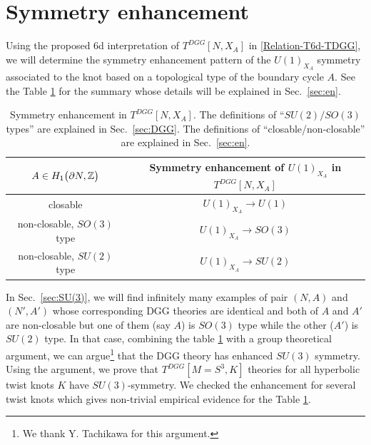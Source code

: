 \documentclass[a4paper,11pt]{article}
\begin{document}
\section{Symmetry enhancement  }\label{sec:symm}

Using the proposed 6d interpretation of $T^{DGG}[N,X_A]$ in \eqref{Relation-T6d-TDGG}, we will determine the  symmetry enhancement pattern of  the $U(1)_{X_A}$ symmetry associated to the knot based on a topological type of the boundary cycle $A$. 
See the Table \ref{Sym enhancement in DGG} for the summary whose details will be explained in Sec.~\ref{sec:en}.
%
\begin{table}[h!]
\centering
\begin{tabular}{|c || c | }
\hline
$A \in H_1 \big{(}\partial N,\mathbb{Z}\big{)}$ & Symmetry enhancement of $U(1)_{X_A}$  in $T^{ DGG}[N,X_A]$ 
\\
\hline
\hline
closable &  $U(1)_{X_A} \rightarrow U(1)$  \\\hline
non-closable, $SO(3)$ type   & $U(1)_{X_A} \rightarrow SO(3)$    \\
\hline
non-closable, $SU(2)$ type  & $U(1)_{X_A} \rightarrow SU(2)$   \\
\hline
\end{tabular}
\caption{Symmetry enhancement in $T^{DGG}[N,X_A]$. The definitions of ``$SU(2)/SO(3)$ types'' are explained in Sec.~\ref{sec:DGG}.
The definitions of ``closable/non-closable'' are explained in Sec.~\ref{sec:en}.}
\label{Sym enhancement in DGG}
\end{table}
%

In Sec.~\ref{sec:SU(3)}, 
we will find infinitely many examples of pair $(N,A)$ and $(N',A')$ whose corresponding DGG theories are identical and both of $A$ and $A'$ are non-closable but 
one of them (say $A$) is $SO(3)$ type while the other ($A'$) is $SU(2)$ type. In that case, combining the table \ref{Sym enhancement in DGG} with a group theoretical argument,  we can argue\footnote{We thank Y. Tachikawa for this argument.} that the DGG theory has enhanced $SU(3)$ symmetry. Using the argument, we prove that $T^{DGG}[M=S^3, K]$ theories for all hyperbolic twist knots $K$ have $SU(3)$-symmetry. We checked the enhancement for several twist knots which gives  non-trivial empirical evidence for the Table \ref{Sym enhancement in DGG}. 
\end{document}
